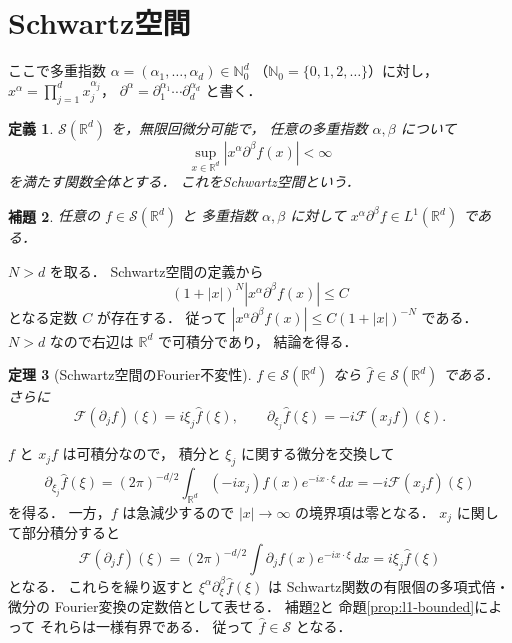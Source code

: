 \documentclass[a5paper,10pt,onecolumn]{jsarticle}
\makeatletter
\theoremstyle{mathnotetheorem}
\newtheorem{theorem}{定理}[section]
\newtheorem{definition}[theorem]{定義}
\newtheorem{lemma}[theorem]{補題}
\renewcommand{\proofname}{証明}
\renewenvironment{proof}[1][\proofname]{%
  \par\pushQED{\qed}\normalfont\topsep4\p@\@plus2\p@\relax
  \trivlist\item[\hskip\labelsep\bfseries #1]\ignorespaces
}{\popQED\endtrivlist\@endpefalse}
\makeatother
\begin{document}
\section{Schwartz空間}
ここで多重指数 $\alpha=(\alpha_1,\ldots,\alpha_d)\in\mathbb N_0^d$
（$\mathbb N_0=\{0,1,2,\ldots\}$）に対し，
$x^\alpha=\prod_{j=1}^d x_j^{\alpha_j}$，
$\partial^\alpha=\partial_1^{\alpha_1}\cdots\partial_d^{\alpha_d}$ と書く．

\begin{definition}
$\mathcal S(\mathbb R^d)$ を，無限回微分可能で，
任意の多重指数 $\alpha,\beta$ について
\[
 \sup_{x\in\mathbb R^d}
 |x^\alpha\partial^\beta f(x)|<\infty
\]
を満たす関数全体とする．
これをSchwartz空間という．
\end{definition}

\begin{lemma}\label{lem:schwartz-l1}
任意の $f\in\mathcal S(\mathbb R^d)$ と
多重指数 $\alpha,\beta$ に対して
$x^\alpha\partial^\beta f\in L^1(\mathbb R^d)$ である．
\end{lemma}
\begin{proof}
$N>d$ を取る．
Schwartz空間の定義から
\[
 (1+|x|)^N|x^\alpha\partial^\beta f(x)|
 \le C
\]
となる定数 $C$ が存在する．
従って
$|x^\alpha\partial^\beta f(x)|
 \le C(1+|x|)^{-N}$ である．
$N>d$ なので右辺は $\mathbb R^d$ で可積分であり，
結論を得る．
\end{proof}

\begin{theorem}[Schwartz空間のFourier不変性]\label{thm:schwartz}
$f\in\mathcal S(\mathbb R^d)$ なら
$\widehat f\in\mathcal S(\mathbb R^d)$ である．
さらに
\[
 \mathcal F(\partial_jf)(\xi)=i\xi_j\widehat f(\xi),
 \qquad
 \partial_{\xi_j}\widehat f(\xi)
 =-i\mathcal F(x_jf)(\xi).
\]
\end{theorem}
\begin{proof}
$f$ と $x_jf$ は可積分なので，
積分と $\xi_j$ に関する微分を交換して
\[
 \partial_{\xi_j}\widehat f(\xi)
 =(2\pi)^{-d/2}\int_{\mathbb R^d}
 (-ix_j)f(x)e^{-ix\cdot\xi}\,dx
 =-i\mathcal F(x_jf)(\xi)
\]
を得る．
一方，$f$ は急減少するので
$|x|\to\infty$ の境界項は零となる．
$x_j$ に関して部分積分すると
\[
 \mathcal F(\partial_jf)(\xi)
 =(2\pi)^{-d/2}\int
 \partial_jf(x)e^{-ix\cdot\xi}\,dx
 =i\xi_j\widehat f(\xi)
\]
となる．
これらを繰り返すと
$\xi^\alpha\partial_\xi^\beta\widehat f(\xi)$ は
Schwartz関数の有限個の多項式倍・微分の
Fourier変換の定数倍として表せる．
補題\ref{lem:schwartz-l1}と
命題\ref{prop:l1-bounded}によって
それらは一様有界である．
従って $\widehat f\in\mathcal S$ となる．
\end{proof}
\end{document}
